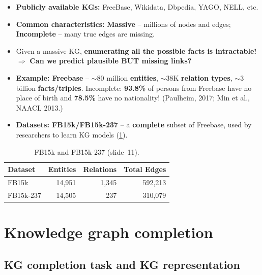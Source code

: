 \begin{itemize}
  \item \textbf{Publicly available KGs:} FreeBase, Wikidata, Dbpedia, YAGO, NELL,
    etc.
  \item \textbf{Common characteristics:} \textbf{Massive} -- millions of nodes and
    edges; \textbf{Incomplete} -- many true edges are missing.
  \item Given a massive KG, \textbf{enumerating all the possible facts is
    intractable!} $\Rightarrow$ \textbf{Can we predict plausible BUT missing
    links?}
  \item \textbf{Example: Freebase} -- $\sim$80 million \textbf{entities},
    $\sim$38K \textbf{relation types}, $\sim$3 billion \textbf{facts/triples}.
    Incomplete: \textbf{93.8\%} of persons from Freebase have no place of birth
    and \textbf{78.5\%} have no nationality! (Paulheim, 2017; Min et al., NAACL
    2013.)
  \item \textbf{Datasets: FB15k/FB15k-237} -- a \textbf{complete} subset of
    Freebase, used by researchers to learn KG models (\cref{tab:lec10-fb15k}).
\end{itemize}

\begin{table}[htbp]
  \centering\small
  \caption{FB15k and FB15k-237 (slide~11).}\label{tab:lec10-fb15k}
  \begin{tabular}{@{}lrrr@{}}
    \toprule
    Dataset & Entities & Relations & Total Edges\\
    \midrule
    FB15k     & 14,951 & 1,345 & 592,213\\
    FB15k-237 & 14,505 &   237 & 310,079\\
    \bottomrule
  \end{tabular}
\end{table}

\section{Knowledge graph completion}\label{sec:lec10-completion}

\subsection{KG completion task and KG representation}\label{sec:lec10-task}

